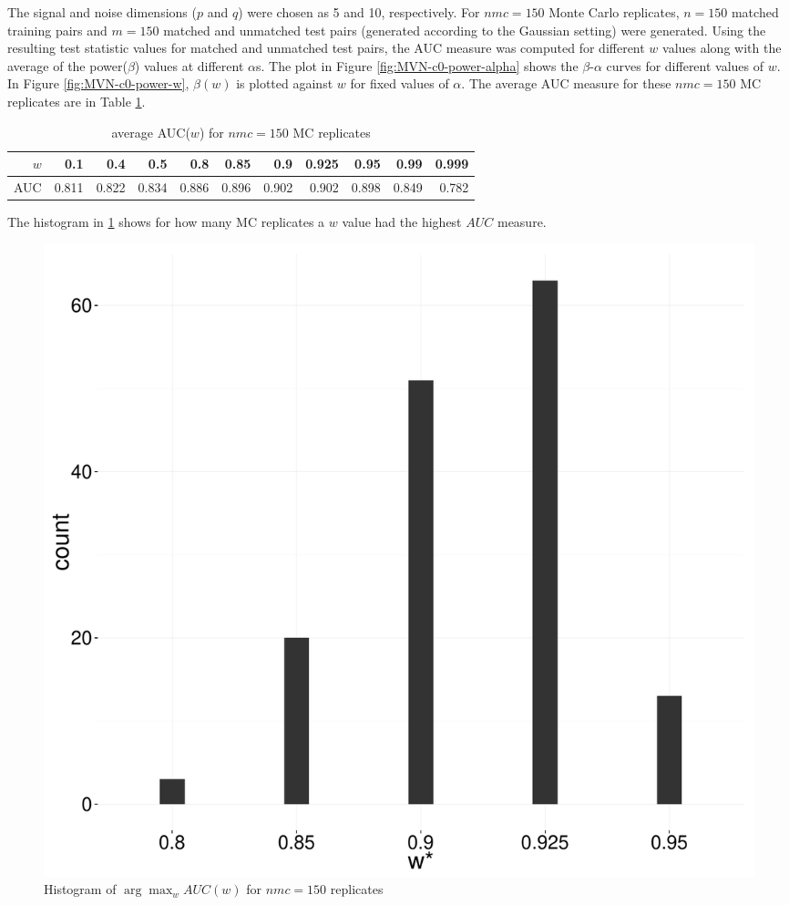 \documentclass[12pt]{article} %
\begin{document}

	


The signal  and noise dimensions ($p$ and $q$) were chosen as 5 and 10, respectively.  For $nmc=150$ Monte Carlo replicates,  $n=150$ matched training pairs and $m=150$ matched and unmatched test pairs (generated according to the Gaussian setting) were generated. Using the resulting test statistic values for matched and unmatched test pairs, the AUC measure was computed for different $w$ values along with the average of the power($\beta$) values at  different $\alpha$s. The plot in Figure \ref{fig:MVN-c0-power-alpha} shows the  $\beta$-$\alpha$ curves for different values of  $w$. In Figure
 \ref{fig:MVN-c0-power-w},  $\beta(w)$ is plotted against $w$ for fixed values of $\alpha$.  
The average AUC measure for these $nmc=150$ MC replicates are  in  Table \ref{tab:AUCW}.

\begin{table}[h]
\centering
\begin{tabular}{rrrrrrrrrrr}
  \hline
$w$ & 0.1 & 0.4 & 0.5 & 0.8 & 0.85 & 0.9 & 0.925 & 0.95 & 0.99 & 0.999 \\ 
  \hline
AUC & 0.811 & 0.822 & 0.834 & 0.886 & 0.896 & 0.902 & 0.902 & 0.898 & 0.849 & 0.782 \\ 
   \hline
\end{tabular}
\caption{average AUC($w$) for $nmc=150$ MC replicates}
	\label{tab:AUCW}
\end{table}


The histogram in 	\ref{fig:ArgMaxWAUCW} shows   for how many  MC replicates a  $w$ value had the highest $AUC$ measure.
\begin{figure}[h]
	\centering
	
		\includegraphics[scale=0.15]{auc_argmax_hist.pdf}
	
	\caption{Histogram of $\arg\max_w AUC(w)$ for $nmc=150$ replicates}
	\label{fig:ArgMaxWAUCW}
\end{figure}
\end{document}

